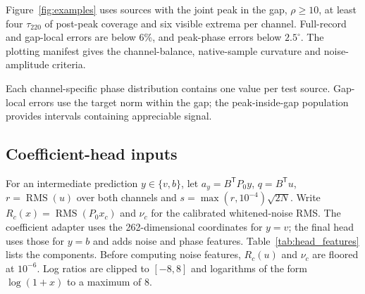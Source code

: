 \documentclass[10pt,prd,aps,a4paper,twocolumn,superscriptaddress,nofootinbib,floatfix]{revtex4-2}
\begin{document}
Figure~\ref{fig:examples} uses sources with the joint peak in the gap, $\rho\ge10$, at least four $\tau_{220}$ of post-peak coverage and six visible extrema per channel. Full-record and gap-local errors are below 6\%, and peak-phase errors below $2.5^\circ$. The plotting manifest gives the channel-balance, native-sample curvature and noise-amplitude criteria.

Each channel-specific phase distribution contains one value per test source. Gap-local errors use the target norm within the gap; the peak-inside-gap population provides intervals containing appreciable signal.



\subsection{Coefficient-head inputs}
For an intermediate prediction $y\in\{v,b\}$, let $a_y=B^{\mathsf T}P_0y$, $q=B^{\mathsf T}u$, $r=\operatorname{RMS}(u)$ over both channels and $s=\max(r,10^{-4})\sqrt{2N}$. Write $R_c(x)=\operatorname{RMS}(P_0x_c)$ and $\nu_c$ for the calibrated whitened-noise RMS. The coefficient adapter uses the 262-dimensional coordinates for $y=v$; the final head uses those for $y=b$ and adds noise and phase features. Table~\ref{tab:head_features} lists the components. Before computing noise features, $R_c(u)$ and $\nu_c$ are floored at $10^{-6}$. Log ratios are clipped to $[-8,8]$ and logarithms of the form $\log(1+x)$ to a maximum of 8.
\end{document}
